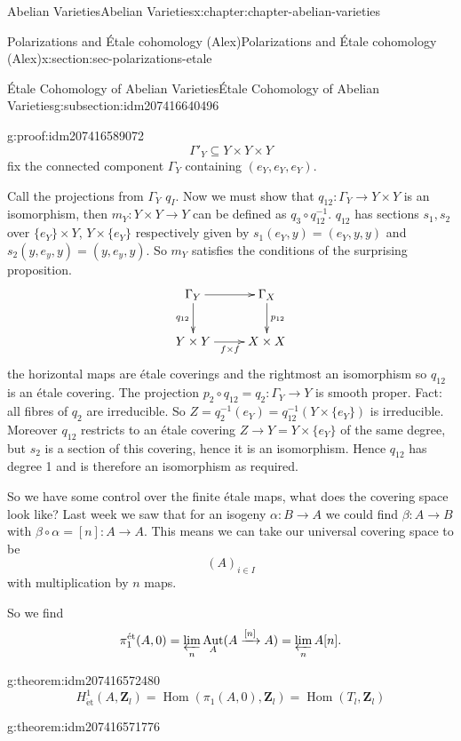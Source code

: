 \documentclass[oneside,10pt,]{book}
\numberwithin{equation}{section}
\newcommand{\lb}{[}
\newcommand{\rb}{]}
\newcommand{\ZZ}{\mathbf{Z}}
\newcommand{\et}{\mathrm{\acute{e}t}}
\DeclareMathOperator{\Hom}{Hom}
\DeclareMathOperator{\Aut}{Aut}
\begin{document}
\begin{chapterptx}{Abelian Varieties}{}{Abelian Varieties}{}{}{x:chapter:chapter-abelian-varieties}
\begin{sectionptx}{Polarizations and Étale cohomology (Alex)}{}{Polarizations and Étale cohomology (Alex)}{}{}{x:section:sec-polarizations-etale}
\begin{subsectionptx}{Étale Cohomology of Abelian Varieties}{}{Étale Cohomology of Abelian Varieties}{}{}{g:subsection:idm207416640496}
\begin{proofptx}{}{g:proof:idm207416589072}
\begin{equation*}
\Gamma'_Y \subseteq Y\times Y\times Y
\end{equation*}
fix the connected component \(\Gamma_Y\) containing \((e_Y,e_Y,e_Y)\).%
\par
Call the projections from \(\Gamma_Y\) \(q_I\). Now we must show that \(q_{12}\colon \Gamma_Y \to Y\times Y\) is an isomorphism, then \(m_Y\colon Y\times Y \to Y\) can be defined as \(q_3 \circ q_{12}^{-1}\). \(q_{12}\) has sections \(s_1,s_2\) over \(\{e_Y\}\times Y\), \(Y\times \{e_Y\}\) respectively given by \(s_1(e_Y,y) = (e_Y,y,y)\) and \(s_2(y,e_y,y) = (y,e_y,y)\). So \(m_Y\) satisfies the conditions of the surprising proposition.%
\begin{equation*}
\xymatrix{
\Gamma_Y \ar[r]\ar[d]_{q_{12}} & \Gamma_X\ar[d]^{p_{12}} \\
Y\times Y \ar[r]_{f\times f} & X\times X
}
\end{equation*}
the horizontal maps are étale coverings and the rightmost an isomorphism so \(q_{12}\) is an étale covering. The projection \(p_2 \circ q_{12} = q_2 \colon \Gamma_Y\to Y\) is smooth proper. Fact: all fibres of \(q_2\) are irreducible. So \(Z = q_2^{-1} (e_Y) = q_{12}^{-1}(Y\times \{e_Y\})\) is irreducible. Moreover \(q_{12}\) restricts to an étale covering \(Z \to Y = Y\times\{e_Y\}\) of  the same degree, but \(s_2\) is a section of this covering, hence it is an isomorphism. Hence \(q_{12}\) has degree 1 and is therefore an isomorphism as required.%
\end{proofptx}
So we have some control over the finite étale maps, what does the covering space look like? Last week we saw that for an isogeny \(\alpha\colon B \to A\) we could find \(\beta \colon A \to B\) with \(\beta\circ\alpha = \lb n\rb\colon A \to A\). This means we can take our universal covering space to be%
\begin{equation*}
(A)_{i\in I}
\end{equation*}
with multiplication by \(n\) maps.%
\par
So we find%
\begin{equation*}
\pi_1^\et(A,0) =\varprojlim_n \Aut_A(A\xrightarrow{[n]} A)=  \varprojlim_n A[n]\text{.}
\end{equation*}
%
\begin{theorem}{}{}{g:theorem:idm207416572480}%
%
\begin{equation*}
H^1_\et(A , \ZZ_l) = \Hom(\pi_1(A,0), \ZZ_l) = \Hom(T_l,\ZZ_l)
\end{equation*}
%
\end{theorem}
\begin{theorem}{}{}{g:theorem:idm207416571776}%

\end{theorem}
\end{subsectionptx}
\end{sectionptx}
\end{chapterptx}
\end{document}
